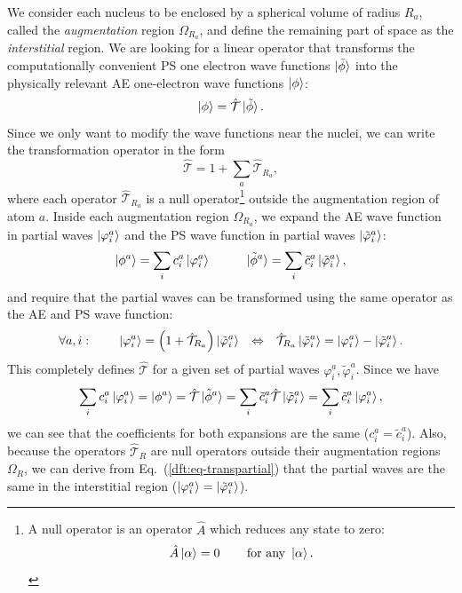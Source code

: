 \begin{refsection}
We consider each nucleus to be enclosed by a spherical volume of radius $R_a$, 
called the \textit{augmentation} region $\Omega_{R_a}$, and define the 
remaining part of space as the \textit{interstitial} region. We are looking 
for a linear operator that transforms the computationally convenient \gls{PS} one 
electron wave functions $\ket{\tilde{\phi}}$ into the physically relevant \gls{AE}
one-electron wave functions $\ket{\phi}$: 
\begin{equation}\label{dft:eq-PAW} 
\ket{\phi} = \hat{\mathcal{T}} \ket{\tilde{\phi}}. 
\end{equation} 
Since we only want to modify the wave functions near the nuclei, we can write 
the transformation operator in the form 
\begin{equation} 
\hat{\mathcal{T}} = 1 + \sum_a \hat{\mathcal{T}}_{R_a}, 
\end{equation} 
where each operator $\hat{\mathcal{T}}_{R_a}$ is a null operator\footnote{A 
null operator is an operator $\hat{A}$ which reduces any state to 
zero:\begin{equation*}\hat{A}\ket{\alpha}=0\hspace{0.3in}\text{for any } 
\ket{\alpha}.\end{equation*}} outside the augmentation region of atom $a$. 
Inside each augmentation region $\Omega_{R_a}$, we expand the \gls{AE} wave function 
in partial waves $\ket{\varphi_i^a}$ and the \gls{PS} wave function in partial waves 
$\ket{\tilde{\varphi}_i^a}$: 
\begin{equation} 
\ket{\phi^a} = \sum_i c_i^a \ket{\varphi_i^a} \hspace{0.4in} 
\ket{\tilde{\phi}^a} = \sum_i \tilde{c}_i^a \ket{\tilde{\varphi}_i^a}, 
\end{equation} 
and require that the partial waves can be transformed using the same operator 
as the \gls{AE} and \gls{PS} wave function: 
\begin{equation}\label{dft:eq-transpartial} 
\forall a,i:\hspace{0.3in}\ket{\varphi_i^a} = \left( 1 + 
\hat{\mathcal{T}}_{R_a} \right) \ket{\tilde{\varphi}_i^a} \hspace{0.1in} 
\Leftrightarrow \hspace{0.1in} \hat{\mathcal{T}}_{R_a} 
\ket{\tilde{\varphi}_i^a} = \ket{\varphi_i^a} - \ket{\tilde{\varphi}_i^a}. 
\end{equation} 
This completely defines $\hat{\mathcal{T}}$ for a given set of partial waves 
$\varphi_i^a,\tilde{\varphi}_i^a$. Since we have 
\begin{equation} 
\sum_i c_i^a \ket{\varphi_i^a} = \ket{\phi^a} = \hat{\mathcal{T}} 
\ket{\tilde{\phi}^a} = \sum_i \tilde{c}_i^a \hat{\mathcal{T}} 
\ket{\tilde{\varphi}_i^a} = \sum_i \tilde{c}_i^a \ket{\varphi_i^a}, 
\end{equation} 
we can see that the coefficients for both expansions are the same ($c_i^a = 
\tilde{c}_i^a$). Also, because the operators $\hat{\mathcal{T}}_R$ are null 
operators outside their augmentation regions $\Omega_R$, we can derive from 
Eq.~(\ref{dft:eq-transpartial}) that the partial waves are the same in the 
interstitial region ($\ket{\varphi_i^a} = \ket{\tilde{\varphi}_i^a}$). 
 

\end{refsection}
